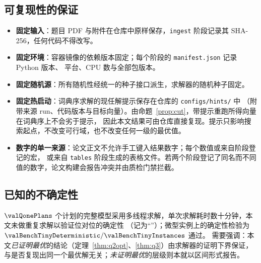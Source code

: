 \subsection{可复现性的保证}

\begin{itemize}[leftmargin=1.6em,itemsep=0.15em]
  \item \textbf{固定输入}：题目 PDF 与附件在仓库中原样保存，\nolinkurl{ingest} 阶段记录其 SHA-256，任何代码不得改写。
  \item \textbf{固定环境}：容器镜像的依赖版本固定；每个阶段的 \nolinkurl{manifest.json} 记录 Python 版本、
        平台、CPU 数与全部包版本。
  \item \textbf{固定随机源}：所有随机性经统一的种子接口派生，求解器的随机种子固定。
  \item \textbf{固定热启动}：词典序求解的现任解提示保存在仓库的 \nolinkurl{configs/hints/} 中
        （附带来源 run、代码版本与目标向量）。由命题~\ref{prop:cut}，带提示重跑所得向量在词典序上不会劣于提示，
        因此本文结果可由仓库直接复现。提示只影响搜索起点，不改变可行域，也不改变任何一级的最优值。
  \item \textbf{数字的单一来源}：论文正文不允许手工键入结果数字；每个数值或来自阶段登记的宏，
        或来自 \nolinkurl{tables} 阶段生成的表格文件。若两个阶段登记了同名而不同值的数字，论文构建会报告冲突并由质检门禁拦截。
\end{itemize}

\subsection{已知的不确定性}

$\valQonePlans$ 个计划的完整模型采用多线程求解，单次求解耗时数十分钟，本文未做重复求解以验证位对位的确定性
（记为“\valQtwoDeterministic{}”）；微型实例上的确定性检验为 $\valBenchTinyDeterministic/\valBenchTinyInstances$ 通过。
需要强调：本文\emph{已证明最优}的结论（定理~\ref{thm:q2opt}、\ref{thm:q3}）由求解器的证明下界保证，
与是否复现出同一个最优解无关；\emph{未证明最优}的层级则本就以区间形式报告。
